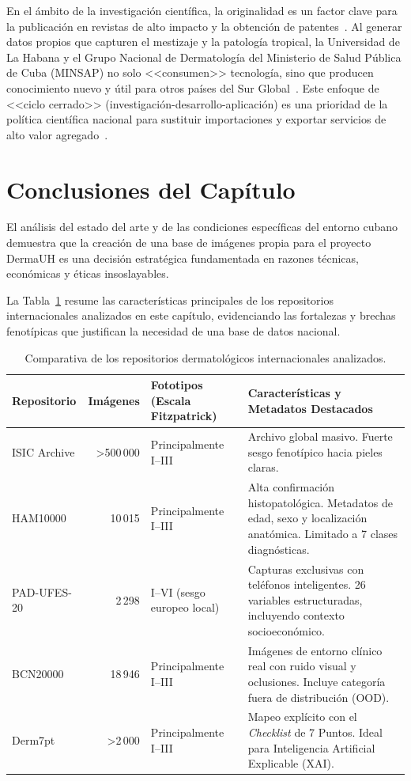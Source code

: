 En el ámbito de la investigación científica, la originalidad es un factor clave para la publicación en 
revistas de alto impacto y la obtención de patentes~\cite{anuies_investigacion,wipo_investigacion_publica}. 
Al generar datos propios que capturen el mestizaje y la patología tropical, la Universidad de La Habana  y 
el Grupo Nacional de Dermatología del Ministerio de Salud Pública de Cuba (MINSAP) no 
solo <<consumen>> tecnología, sino que producen conocimiento nuevo y útil para otros países del 
Sur Global~\cite{wipo_investigacion_publica,scielosp_ciencia_cuba}. Este enfoque de <<ciclo cerrado>> 
(investigación-desarrollo-aplicación) es una prioridad de la política científica nacional para 
sustituir importaciones y exportar servicios de alto valor agregado~\cite{pmc_ciencia_innovacion_cuba,scielosp_ciencia_cuba}.


\section{Conclusiones del Capítulo}\label{sec:conclusiones-cap1}

El análisis del estado del arte y de las condiciones específicas del entorno cubano demuestra que la creación 
de una base de imágenes propia para el proyecto DermaUH es una decisión estratégica fundamentada en razones 
técnicas, económicas y éticas insoslayables.

La Tabla~\ref{tab:comparativa-repositorios} resume las características principales de los repositorios internacionales analizados en este capítulo, evidenciando las fortalezas y brechas fenotípicas que justifican la necesidad de una base de datos nacional.

\begin{table}[htbp]
\centering
\small
\caption{Comparativa de los repositorios dermatológicos internacionales analizados.}\label{tab:comparativa-repositorios}
\begin{tabular}{p{2.5cm}rp{3.5cm}p{6cm}}
\toprule
\textbf{Repositorio} & \textbf{Imágenes} & \textbf{Fototipos (Escala Fitzpatrick)} & \textbf{Características y Metadatos Destacados} \\
\midrule
ISIC Archive & >500\,000 & Principalmente I--III & Archivo global masivo. Fuerte sesgo fenotípico hacia pieles claras. \\
HAM10000 & 10\,015 & Principalmente I--III & Alta confirmación histopatológica. Metadatos de edad, sexo y localización anatómica. Limitado a 7 clases diagnósticas. \\
PAD-UFES-20 & 2\,298 & I--VI (sesgo europeo local) & Capturas exclusivas con teléfonos inteligentes. 26 variables estructuradas, incluyendo contexto socioeconómico. \\
BCN20000 & 18\,946 & Principalmente I--III & Imágenes de entorno clínico real con ruido visual y oclusiones. Incluye categoría fuera de distribución (OOD). \\
Derm7pt & >2\,000 & Principalmente I--III & Mapeo explícito con el \textit{Checklist} de 7 Puntos. Ideal para Inteligencia Artificial Explicable (XAI). \\
\bottomrule
\end{tabular}
\end{table}

